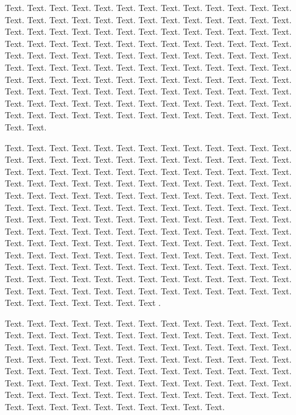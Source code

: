\documentclass[a4,center,fleqn]{NAR}
\begin{document}
Text. Text. Text. Text. Text. Text. Text. Text. Text. Text. Text.
Text. Text. Text. Text. Text. Text. Text. Text. Text. Text. Text.
Text. Text. Text. Text. Text. Text. Text. Text. Text. Text. Text.
Text. Text. Text. Text. Text. Text. Text. Text. Text. Text. Text.
Text. Text. Text. Text. Text. Text. Text. Text. Text. Text. Text.
Text. Text. Text. Text. Text. Text. Text. Text. Text. Text. Text.
Text. Text. Text. Text. Text. Text. Text. Text. Text. Text. Text.
Text. Text. Text. Text. Text. Text. Text. Text. Text. Text. Text.
Text. Text. Text. Text. Text. Text. Text. Text. Text. Text. Text.
Text. Text. Text. Text. Text. Text. Text. Text. Text. Text. Text.
Text. Text. Text. Text. Text. Text. Text. Text. Text. Text. Text.
Text. Text. Text. Text. Text. Text. Text. Text. Text. Text. Text.
\enlargethispage{-65.1pt}

Text. Text. Text. Text. Text. Text.
Text. Text. Text. Text. Text. Text. Text. Text. Text. Text. Text.
Text. Text. Text. Text. Text. Text. Text. Text. Text. Text. Text.
Text. Text. Text. Text. Text. Text. Text. Text. Text. Text. Text.
Text. Text. Text. Text. Text. Text. Text. Text. Text. Text. Text.
Text. Text. Text. Text. Text. Text. Text. Text. Text. Text. Text.
Text. Text. Text. Text. Text. Text. Text. Text. Text. Text. Text.
Text. Text. Text. Text. Text. Text. Text. Text. Text. Text. Text.
Text. Text. Text. Text. Text. Text. Text. Text. Text. Text. Text.
Text. Text. Text. Text. Text. Text. Text. Text. Text. Text. Text.
Text. Text. Text. Text. Text. Text. Text. Text. Text. Text. Text.
Text. Text. Text. Text. Text. Text. Text. Text. Text. Text. Text.
Text. Text. Text. Text. Text. Text. Text. Text. Text. Text. Text.
Text. Text. Text. Text. Text. Text. Text. Text. Text. Text. Text.
Text. Text. Text. Text. Text. Text. Text. Text. Text. Text. Text.
Text. Text. Text. Text. Text. Text. Text. Text. Text. Text. Text.
Text. Text. Text. Text.
Text \cite{2,3}.

Text. Text. Text. Text. Text. Text. Text. Text. Text. Text. Text.
Text. Text. Text. Text. Text. Text. Text. Text. Text. Text. Text.
Text. Text. Text. Text. Text. Text. Text. Text. Text. Text. Text.
Text. Text. Text. Text. Text. Text. Text. Text. Text. Text. Text.
Text. Text. Text. Text. Text. Text. Text. Text. Text. Text. Text.
Text. Text. Text. Text. Text. Text. Text. Text. Text. Text. Text.
Text. Text. Text. Text. Text. Text. Text. Text. Text. Text. Text.
Text. Text. Text. Text. Text. Text. Text. Text. Text. Text. Text.
Text. Text. Text. Text. Text. Text. Text. Text. Text. Text. Text.
Text. Text.
\end{document}
